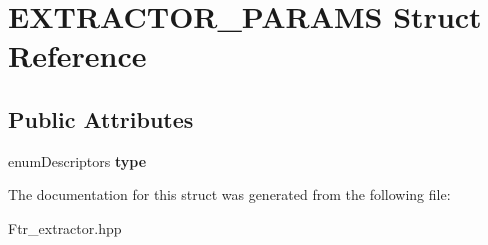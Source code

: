 \hypertarget{struct_e_x_t_r_a_c_t_o_r___p_a_r_a_m_s}{\section{E\+X\+T\+R\+A\+C\+T\+O\+R\+\_\+\+P\+A\+R\+A\+M\+S Struct Reference}
\label{struct_e_x_t_r_a_c_t_o_r___p_a_r_a_m_s}
}
\subsection*{Public Attributes}
\begin{DoxyCompactItemize}
\item 
\hypertarget{struct_e_x_t_r_a_c_t_o_r___p_a_r_a_m_s_a4f76ba0fc6425a836384f03205d758cf}{enum\+Descriptors {\bfseries type}}\label{struct_e_x_t_r_a_c_t_o_r___p_a_r_a_m_s_a4f76ba0fc6425a836384f03205d758cf}

\end{DoxyCompactItemize}


The documentation for this struct was generated from the following file\+:\begin{DoxyCompactItemize}
\item 
Ftr\+\_\+extractor.\+hpp\end{DoxyCompactItemize}
